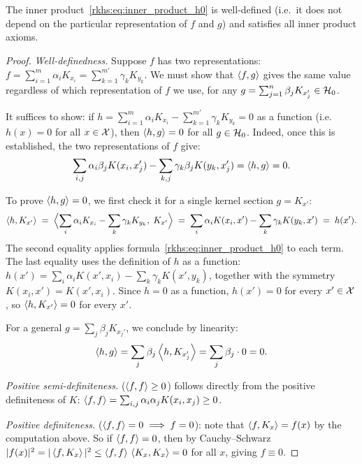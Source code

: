 \begin{notechapter}
\begin{lemma}
\label{rkhs:lem:well_defined}
The inner product~\eqref{rkhs:eq:inner_product_h0} is well-defined (i.e.\ it
does not depend on the particular representation of $f$ and $g$) and
satisfies all inner product axioms.
\end{lemma}

\begin{proof}
\emph{Well-definedness.} Suppose $f$ has two
representations:
$f = \sum_{i=1}^m \alpha_i K_{x_i}
   = \sum_{k=1}^{m'} \gamma_k K_{y_k}$.
We must show that $\left\langle f, g \right\rangle$ gives the same value
regardless of which representation of $f$ we use, for
any $g = \sum_{j=1}^n \beta_j K_{x_j'} \in \mathcal{H}_0$.

It suffices to show: if
$h = \sum_{i=1}^m \alpha_i K_{x_i}
   - \sum_{k=1}^{m'} \gamma_k K_{y_k} = 0$
as a function (i.e.\ $h(x) = 0$ for all $x \in \mathcal{X}$),
then $\left\langle h, g \right\rangle = 0$ for all $g \in \mathcal{H}_0$.
Indeed, once this is established, the two
representations of $f$ give:
\[
\sum_{i,j} \alpha_i \beta_j K(x_i, x_j')
- \sum_{k,j} \gamma_k \beta_j K(y_k, x_j')
= \left\langle h, g \right\rangle = 0.
\]

To prove $\left\langle h, g \right\rangle = 0$, we first check it for
a single kernel section $g = K_{x'}$:
\[
\left\langle h, K_{x'} \right\rangle
\;=\; \Bigl\langle \sum_i \alpha_i K_{x_i}
  - \sum_k \gamma_k K_{y_k},\; K_{x'}\Bigr\rangle
\;=\; \sum_i \alpha_i K(x_i, x')
  - \sum_k \gamma_k K(y_k, x')
\;=\; h(x').
\]
The second equality applies
formula~\eqref{rkhs:eq:inner_product_h0} to each term.
The last equality uses the definition of $h$ as
a function: $h(x') = \sum_i \alpha_i K(x', x_i)
- \sum_k \gamma_k K(x', y_k)$, together with the
symmetry $K(x_i, x') = K(x', x_i)$. Since $h = 0$
as a function, $h(x') = 0$ for every $x' \in \mathcal{X}$,
so $\left\langle h, K_{x'} \right\rangle = 0$ for every $x'$.

For a general $g = \sum_j \beta_j K_{x_j'}$, we
conclude by linearity:
\[
\left\langle h, g \right\rangle
= \sum_j \beta_j \left\langle h, K_{x_j'} \right\rangle
= \sum_j \beta_j \cdot 0 = 0.
\]

\medskip
\emph{Positive semi-definiteness.}
($\left\langle f, f \right\rangle \geq 0$) follows directly from the
positive definiteness of $K$:
$\left\langle f, f \right\rangle = \sum_{i,j} \alpha_i \alpha_j
K(x_i, x_j) \geq 0$.

\medskip
\emph{Positive definiteness.}
($\left\langle f, f \right\rangle = 0 \implies f = 0$): note that
$\left\langle f, K_x \right\rangle = f(x)$ by the computation above.
So if $\left\langle f, f \right\rangle = 0$, then by Cauchy--Schwarz
$|f(x)|^2 = |\left\langle f, K_x \right\rangle|^2
\leq \left\langle f, f \right\rangle\,\left\langle K_x, K_x \right\rangle = 0$
for all $x$, giving $f \equiv 0$.
\end{proof}


\end{notechapter}
